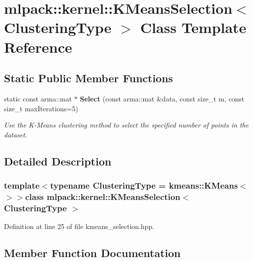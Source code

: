 \section{mlpack\-:\-:kernel\-:\-:K\-Means\-Selection$<$ Clustering\-Type $>$ Class Template Reference}
\label{classmlpack_1_1kernel_1_1KMeansSelection}
\subsection*{Static Public Member Functions}
\begin{DoxyCompactItemize}
\item 
static const arma\-::mat $\ast$ {\bf Select} (const arma\-::mat \&data, const size\-\_\-t m, const size\-\_\-t max\-Iterations=5)
\begin{DoxyCompactList}\small\item\em Use the K-\/\-Means clustering method to select the specified number of points in the dataset. \end{DoxyCompactList}\end{DoxyCompactItemize}


\subsection{Detailed Description}
\subsubsection*{template$<$typename Clustering\-Type = kmeans\-::\-K\-Means$<$$>$$>$class mlpack\-::kernel\-::\-K\-Means\-Selection$<$ Clustering\-Type $>$}



Definition at line 25 of file kmeans\-\_\-selection.\-hpp.



\subsection{Member Function Documentation}
